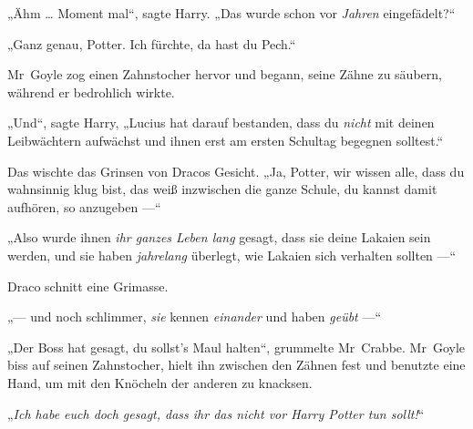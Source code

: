 „Ähm … Moment mal“, sagte Harry.
„Das wurde schon vor \emph{Jahren} eingefädelt?“

„Ganz genau, Potter. Ich fürchte, da hast du Pech.“

Mr~Goyle zog einen Zahnstocher hervor und begann, seine Zähne zu säubern, während er bedrohlich wirkte.

„Und“, sagte Harry,
„Lucius hat darauf bestanden, dass du \emph{nicht} mit deinen Leibwächtern aufwächst und ihnen erst am ersten Schultag begegnen solltest.“

Das wischte das Grinsen von Dracos Gesicht.
„Ja, Potter, wir wissen alle, dass du wahnsinnig klug bist, das weiß inzwischen die ganze Schule, du kannst damit aufhören, so anzugeben —“

„Also wurde ihnen \emph{ihr ganzes Leben lang} gesagt, dass sie deine Lakaien sein werden, und sie haben \emph{jahrelang} überlegt, wie Lakaien sich verhalten sollten —“

Draco schnitt eine Grimasse.

„— und noch schlimmer, \emph{sie} kennen \emph{einander} und haben \emph{geübt} —“

„Der Boss hat gesagt, du sollst’s Maul halten“, grummelte Mr~Crabbe. Mr~Goyle biss auf seinen Zahnstocher, hielt ihn zwischen den Zähnen fest und benutzte eine Hand, um mit den Knöcheln der anderen zu knacksen.

„\emph{Ich habe euch doch gesagt, dass ihr das nicht vor Harry Potter tun sollt!}“


